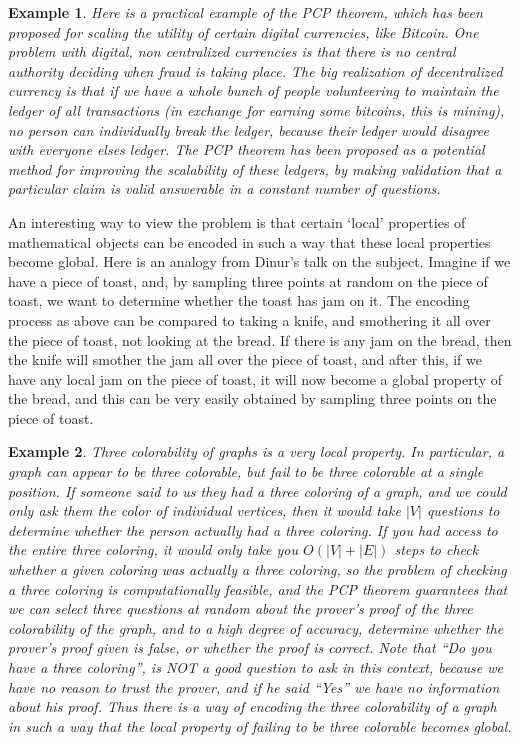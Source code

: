 \documentclass{article}
\theoremstyle{plain}
\newtheorem*{example}{Example}
\theoremstyle{definition}
\begin{document}
\begin{example}
    Here is a practical example of the PCP theorem, which has been proposed for scaling the utility of certain digital currencies, like Bitcoin. One problem with digital, non centralized currencies is that there is no central authority deciding when fraud is taking place. The big realization of decentralized currency is that if we have a whole bunch of people volunteering to maintain the ledger of all transactions (in exchange for earning some bitcoins, this is mining), no person can individually break the ledger, because their ledger would disagree with everyone elses ledger. The PCP theorem has been proposed as a potential method for improving the scalability of these ledgers, by making validation that a particular claim is valid answerable in a constant number of questions.
\end{example}

An interesting way to view the problem is that certain `local' properties of mathematical objects can be encoded in such a way that these local properties become global. Here is an analogy from Dinur's talk on the subject. Imagine if we have a piece of toast, and, by sampling three points at random on the piece of toast, we want to determine whether the toast has jam on it. The encoding process as above can be compared to taking a knife, and smothering it all over the piece of toast, not looking at the bread. If there is any jam on the bread, then the knife will smother the jam all over the piece of toast, and after this, if we have any local jam on the piece of toast, it will now become a global property of the bread, and this can be very easily obtained by sampling three points on the piece of toast.

\begin{example}
    Three colorability of graphs is a very local property. In particular, a graph can appear to be three colorable, but fail to be three colorable at a single position. If someone said to us they had a three coloring of a graph, and we could only ask them the color of individual vertices, then it would take $|V|$ questions to determine whether the person actually had a three coloring. If you had access to the entire three coloring, it would only take you $O(|V| + |E|)$ steps to check whether a given coloring was actually a three coloring, so the problem of checking a three coloring is computationally feasible, and the PCP theorem guarantees that we can select three questions at random about the prover's proof of the three colorability of the graph, and to a high degree of accuracy, determine whether the prover's proof given is false, or whether the proof is correct. Note that ``Do you have a three coloring'', is NOT a good question to ask in this context, because we have no reason to trust the prover, and if he said ``Yes'' we have no information about his proof. Thus there is a way of encoding the three colorability of a graph in such a way that the local property of failing to be three colorable becomes global.
\end{example}
\end{document}
